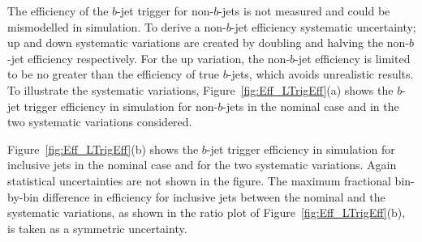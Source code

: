 The efficiency of the $b$-jet trigger for non-$b$-jets is not measured and could be mismodelled in simulation.
To derive a non-$b$-jet efficiency systematic uncertainty; up and down systematic variations are created by doubling and halving the non-$b$-jet efficiency respectively.
For the up variation, the non-$b$-jet efficiency is limited to be no greater than the efficiency of true $b$-jets, which avoids unrealistic results.
To illustrate the systematic variations,
Figure~\ref{fig:Eff_LTrigEff}(a) shows the $b$-jet trigger efficiency in simulation for non-$b$-jets in the nominal case and in the two systematic variations considered.

Figure~\ref{fig:Eff_LTrigEff}(b) shows the $b$-jet trigger efficiency in simulation for inclusive jets in the nominal case and for the two systematic variations.
Again statistical uncertainties are not shown in the figure. %
The maximum fractional bin-by-bin difference in efficiency for inclusive jets between the nominal and the systematic variations,
as shown in the ratio plot of Figure~\ref{fig:Eff_LTrigEff}(b),
is taken as a symmetric uncertainty.

